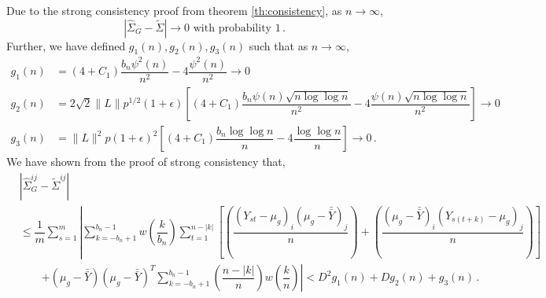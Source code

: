 \documentclass[11pt]{article}
\theoremstyle{remark}
\begin{document}
 Due to the strong consistency proof from theorem \ref{th:consistency}, as $n \to \infty$,
\begin{equation}
\label{eq:G-SVE_asv_consis}
 \left|\hat{\Sigma}_{G} -  \tilde{\Sigma}\right| \to 0 \text{ with probability 1}\,. 
\end{equation}
Further, we have defined $g_1(n), g_2(n), g_3(n)$ such that as $n \to \infty$,
\begin{align*}
    g_1(n) &= (4+C_1)\dfrac{b_n \psi^2(n)}{n^2} - 4\dfrac{\psi^2(n)}{n^2} \to 0\\
    g_2(n) &= 2\sqrt{2}\|L\|p^{1/2}(1+\epsilon)\left[(4+C_1)\dfrac{b_n\psi(n)\sqrt{n\log \log n}}{n^2} - 4\dfrac{\psi(n)\sqrt{n\log \log n}}{n^2}\right] \to 0\\
    g_3(n) &= \|L\|^2 p (1+\epsilon)^2\left[(4+C_1)\dfrac{b_n \log\log n}{n} - 4 \dfrac{\log \log n}{n}\right] \to 0\,.
\end{align*}
%
We have shown from the proof of strong consistency that,
\begin{align*}
 &\left| \hat{\Sigma}_{G}^{ij} - \tilde{\Sigma}^{ij} \right|\\
 & \leq \dfrac{1}{m} \sum_{s=1}^m \left| \sum_{k=-b_n+1}^{b_n-1} w \left(\dfrac{k}{b_n} \right) \sum_{t=1}^{n-|k|}   \left[ \left( \dfrac{(Y_{st} - \mu_g)_i(\mu_g-\bar{\bar{Y}})_j}{n}\right)+ \left(\dfrac{(\mu_g-\bar{\bar{Y}})_i(Y_{s(t+k)}-\mu_g)_j}{n}\right) \right] \right.\\
& \quad \quad  \left. + (\mu_g-\bar{\bar{Y}})(\mu_g-\bar{\bar{Y}})^T\sum_{k=-b_n+1}^{b_n-1}\left(\dfrac{n-|k|}{n}\right)w\left(\dfrac{k}{n}\right) \right|  < D^2g_1(n) + Dg_2(n) + g_3(n)\,.
\end{align*}
\end{document}
